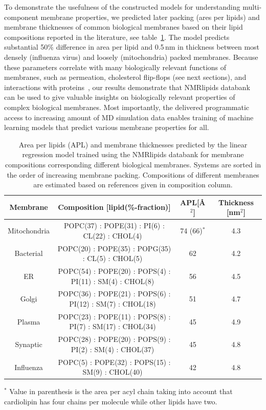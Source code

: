 \documentclass[fleqn,10pt]{wlscirep}
\begin{document}
To demonstrate the usefulness of the constructed models for understanding multi-component membrane properties, we predicted later packing (ares per lipids) and membrane thicknesses of common biological membranes based on their lipid compositions reported in the literature, see table~\ref{tab:MLpredictions}. The model predicts substantial 50\% difference in area per lipid and 0.5\,nm in thickness between most densely (influenza virus) and loosely (mitochondria) packed membranes. Because these parameters correlate with many biologically relevant functions of membranes, such as permeation, cholesterol flip-flops (see next sections), and interactions with proteins~\cite{phillips09}, our results demonstrate that NMRlipids databank can be used to give valuable insights on biologically relevant properties of complex biological membranes. Most importantly, the delivered programmatic access to increasing amount of MD simulation data enables training of machine learning models that predict various membrane properties for all.

    \begin{table}[htb]
    \caption{Area per lipids (APL) and membrane thicknesses predicted by the linear regression model trained using the NMRlipids databank for membrane compositions corresponding different biological membranes. Systems are sorted in the order of increasing membrane packing. Compositions of different membranes are estimated based on references given in composition column.}
        \centering
        \begin{tabular}{cccc}
             Membrane&  Composition [lipid(\%-fraction)]&  APL[\AA$^2$] & Thickness [nm$^2$]\\
             \hline
             Mitochondria & POPC(37) : POPE(31) : PI(6) : CL(22) : 
             CHOL(4)~\cite{vanmeer08,escriba15,casares19} & 74 (66)$^*$ & 4.3 \\
             Bacterial & POPC(20) : POPE(35) : POPG(35) : CL(5) : CHOL(5)~\cite{chwastek20}  & 62 & 4.2 \\
             ER &  POPC(54) : POPE(20) : POPS(4) : PI(11) : SM(4) : CHOL(8)~\cite{vanmeer08,escriba15,casares19} & 56 & 4.5 \\
             Golgi & POPC(36) : POPE(21) : POPS(6) : PI(12) : SM(7) : CHOL(18)~\cite{vanmeer08,escriba15,casares19} & 51 & 4.7 \\
             Plasma & POPC(23) : POPE(11) : POPS(8) : PI(7) : SM(17) : CHOL(34)~\cite{vanmeer08,escriba15,casares19} & 45 & 4.9 \\
             Synaptic & POPC(28) : POPE(20) : POPS(9) : PI(2) : SM(4) : CHOL(37)~\cite{binotti21}  &  45 & 4.8 \\
             Influenza & POPC(5) : POPE(32) : POPS(15) : SM(9) : CHOL(40)~\cite{gerl12,ivanova15} & 42 & 4.8 \\
        \end{tabular}
        \label{tab:MLpredictions}
        
        $^*$ Value in parenthesis is the area per acyl chain taking into account that cardiolipin has four chains per molecule while other lipids have two.
    \end{table}
    
\end{document}
